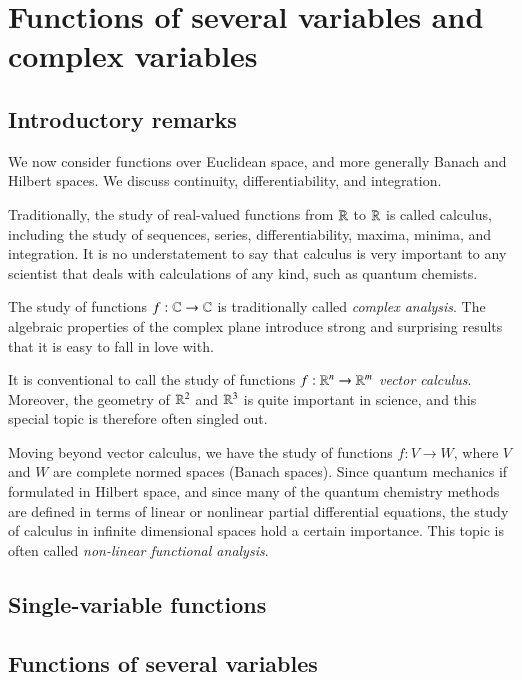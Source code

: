 \chapter{Functions of several variables and complex variables}
\label{sec:calculus}

\section{Introductory remarks}

We now consider functions over Euclidean space, and more generally Banach and Hilbert spaces. We discuss continuity, differentiability, and integration.

Traditionally, the study of real-valued functions from $\mathbb{R}$ to $\mathbb{R}$ is called calculus, including the study of sequences, series, differentiability, maxima, minima, and integration. It is no understatement to say that calculus is very important to any scientist that deals with calculations of any kind, such as quantum chemists.

The study of functions $f : \mathbb{C}\to\mathbb{C}$ is traditionally called \emph{complex analysis}. The algebraic properties of the complex plane introduce strong and surprising results that it is easy to fall in love with.

It is conventional to call the study of functions $f : \mathbb{R}^n \to \mathbb{R}^m$ \emph{vector calculus}. Moreover, the geometry of $\mathbb{R}^2$ and $\mathbb{R}^3$ is quite important in science, and this special topic is therefore often singled out.

Moving beyond vector calculus, we have the study of functions $f : V \to W$, where $V$ and $W$ are complete normed spaces (Banach spaces). Since quantum mechanics if formulated in Hilbert space, and since many of the quantum chemistry methods are defined in terms of linear or nonlinear partial differential equations, the study of calculus in infinite dimensional spaces hold a certain importance. This topic is often called \emph{non-linear functional analysis}.



\section{Single-variable functions}

\section{Functions of several variables}

